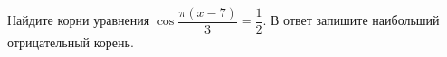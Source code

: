 \begin{ex}
	\begin{condition}
		Найдите корни уравнения \( \cos\dfrac{\pi(x-7)}{3}=\dfrac{1}{2} \). В ответ запишите наибольший отрицательный корень.
	\end{condition}
\end{ex}